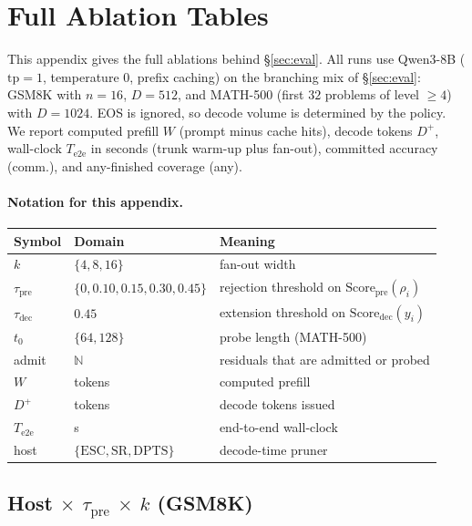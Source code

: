 \section{Full Ablation Tables}
\label{sec:ablation-full}

This appendix gives the full ablations behind \S\ref{sec:eval}.
All runs use Qwen3-8B ($\mathrm{tp}{=}1$, temperature $0$, prefix caching) on the branching mix of \S\ref{sec:eval}:
GSM8K with $n{=}16$, $D{=}512$, and MATH-500 (first $32$ problems of level $\ge4$) with $D{=}1024$.
EOS is ignored, so decode volume is determined by the policy.
We report computed prefill $W$ (prompt minus cache hits), decode tokens $D^{+}$, wall-clock $T_{\mathrm{e2e}}$ in seconds (trunk warm-up plus fan-out),
committed accuracy (comm.), and any-finished coverage (any).

\paragraph{Notation for this appendix.}
\begin{center}
\scriptsize
\begin{tabular}{@{}llp{}@{}}
\toprule
Symbol & Domain & Meaning \\
\midrule
$k$ & $\{4,8,16\}$ & fan-out width \\
$\tau_{\mathrm{pre}}$ & $\{0,0.10,0.15,0.30,0.45\}$ & rejection threshold on $\mathrm{Score}_{\mathrm{pre}}(\rho_i)$ \\
$\tau_{\mathrm{dec}}$ & $0.45$ & extension threshold on $\mathrm{Score}_{\mathrm{dec}}(y_i)$ \\
$t_0$ & $\{64,128\}$ & probe length (MATH-500) \\
admit & $\mathbb{N}$ & residuals that are admitted or probed \\
$W$ & tokens & computed prefill \\
$D^{+}$ & tokens & decode tokens issued \\
$T_{\mathrm{e2e}}$ & s & end-to-end wall-clock \\
host & $\{\mathrm{ESC},\mathrm{SR},\mathrm{DPTS}\}$ & decode-time pruner \\
\bottomrule
\end{tabular}
\end{center}

\subsection{Host $\times$ $\tau_{\mathrm{pre}}$ $\times$ $k$ (GSM8K)}
\label{sec:ablate-thresh}

